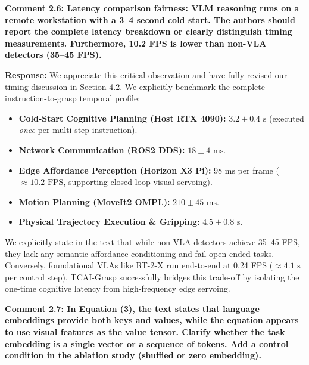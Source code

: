 \documentclass[11pt]{article}
\newcommand{\reviewercomment}[1]{\vspace{1.8ex}\noindent\textbf{\textcolor{revcolor}{#1}}}
\newcommand{\response}{\vspace{1ex}\noindent\textbf{Response: }}
\begin{document}
\reviewercomment{Comment 2.6: Latency comparison fairness: VLM reasoning runs on a remote workstation with a 3--4 second cold start. The authors should report the complete latency breakdown or clearly distinguish timing measurements. Furthermore, 10.2 FPS is lower than non-VLA detectors (35--45 FPS).}

\response
We appreciate this critical observation and have fully revised our timing discussion in Section 4.2. We explicitly benchmark the complete instruction-to-grasp temporal profile:
\begin{itemize}[leftmargin=*]
    \item \textbf{Cold-Start Cognitive Planning (Host RTX 4090):} $3.2 \pm 0.4\text{ s}$ (executed \textit{once} per multi-step instruction).
    \item \textbf{Network Communication (ROS2 DDS):} $18 \pm 4\text{ ms}$.
    \item \textbf{Edge Affordance Perception (Horizon X3 Pi):} $98\text{ ms}$ per frame ($\approx 10.2\text{ FPS}$, supporting closed-loop visual servoing).
    \item \textbf{Motion Planning (MoveIt2 OMPL):} $210 \pm 45\text{ ms}$.
    \item \textbf{Physical Trajectory Execution \& Gripping:} $4.5 \pm 0.8\text{ s}$.
\end{itemize}
We explicitly state in the text that while non-VLA detectors achieve 35--45 FPS, they lack any semantic affordance conditioning and fail open-ended tasks. Conversely, foundational VLAs like RT-2-X run end-to-end at 0.24 FPS ($\approx 4.1\text{ s}$ per control step). TCAI-Grasp successfully bridges this trade-off by isolating the one-time cognitive latency from high-frequency edge servoing.

\reviewercomment{Comment 2.7: In Equation (3), the text states that language embeddings provide both keys and values, while the equation appears to use visual features as the value tensor. Clarify whether the task embedding is a single vector or a sequence of tokens. Add a control condition in the ablation study (shuffled or zero embedding).}
\end{document}
